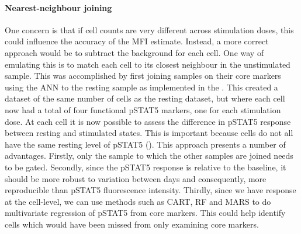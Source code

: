 \paragraph{Nearest-neighbour joining}
One concern is that if cell counts are very different across stimulation doses, this could influence the accuracy of the MFI estimate.
Instead, a more correct approach would be to subtract the background for each cell.
One way of emulating this is to match each cell to its closest neighbour in the unstimulated sample.  
This was accomplished by first joining samples on their core markers using the \gls{ANN} to the resting sample \citep{Jones:2011ez}
as implemented in the .
This created a dataset of the same number of cells as the resting dataset, but where each cell now had a total of four functional pSTAT5 markers,
one for each stimulation dose.
At each cell it is now possible to assess the difference in pSTAT5 response between resting and stimulated states.
This is important because cells do not all have the same resting level of pSTAT5 ().
This approach presents a number of advantages.
Firstly, only the sample to which the other samples are joined needs to be gated.
Secondly, since the pSTAT5 response is relative to the baseline, it should be more robust to variation between days
and consequently, more reproducible than pSTAT5 fluorescence intensity.
Thirdly, since we have response at the cell-level, we can use methods
such as \gls{CART}, \gls{RF} and \gls{MARS} to do multivariate regression of pSTAT5 from core markers.
This could help identify cells which would have been missed from only examining core markers.
